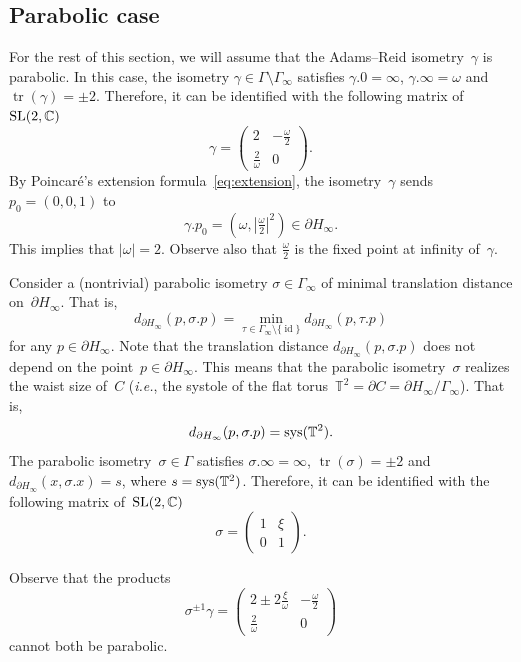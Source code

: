 \documentclass[11pt,reqno]{amsart}
\theoremstyle{definition}
\numberwithin{equation}{section}
\newcommand\T {{\mathbb T}}
\newcommand\C {{\mathbb C}}
\newcommand\ie{{\it i.e.}}
\DeclareMathOperator{\sys}{{\rm sys}}
\DeclareMathOperator{\id}{id}
\DeclareMathOperator{\tr}{tr}
\newcommand{\SL}{{\rm SL}}
\numberwithin{equation}{section}
\begin{document}
\subsection{Parabolic case}


For the rest of this section, we will assume that the Adams--Reid isometry~$\gamma$ is parabolic.
In this case, the isometry $\gamma \in \Gamma \setminus \Gamma_\infty$ satisfies $\gamma.0=\infty$, $\gamma.\infty=\omega$ and~$\tr(\gamma)=\pm 2$.
Therefore, it can be identified with the following matrix of~$\SL(2,\C)$
\[
\gamma = 
\begin{pmatrix}
2 & - \frac{\omega}{2} \\
\frac{2}{\omega} & 0
\end{pmatrix}.
\]
By Poincar\'e's extension formula~\eqref{eq:extension}, the isometry~$\gamma$ sends $p_0=(0,0,1)$ to
\[
\gamma .p_0 = \left( \omega, \left| \tfrac{\omega}{2} \right|^2 \right) \in \partial H_\infty.
\]
This implies that $|\omega| = 2$.
Observe also that $\frac{\omega}{2}$ is the fixed point at infinity of~$\gamma$.

\medskip

Consider a (nontrivial) parabolic isometry $\sigma \in \Gamma_\infty$ of minimal translation distance on~$\partial H_\infty$.
That is,
\[
d_{\partial H_\infty}(p, \sigma .p) = \min_{\tau \in \Gamma_\infty \setminus \{ \id \}} d_{\partial H_\infty}(p, \tau .p)
\]
for any $p \in \partial H_\infty$.
Note that the translation distance $d_{\partial H_\infty}(p, \sigma .p)$ does not depend on the point~$p \in \partial H_\infty$.
This means that the parabolic isometry~$\sigma$ realizes the waist size of~$C$ (\ie, the systole of the flat torus~$\T^2 = \partial C = \partial H_\infty / \Gamma_\infty$).
That is,
\begin{equation} \label{eq:s}
d_{\partial H_\infty}(p, \sigma .p) = \sys(\T^2).
\end{equation}
The parabolic isometry~$\sigma \in \Gamma$ satisfies $\sigma . \infty=\infty$, $\tr(\sigma)=\pm 2$ and $d_{\partial H_\infty}(x,\sigma .x) = s$, where $s=\sys(\T^2)$.
Therefore, it can be identified with the following matrix of~$\SL(2,\C)$
\[
\sigma = 
\begin{pmatrix}
1 & \xi \\
0 & 1
\end{pmatrix}.
\]

Observe that the products
\[
\sigma^{\pm 1} \gamma = 
\begin{pmatrix}
2 \pm 2 \frac{\xi}{\omega} & - \frac{\omega}{2} \\
\frac{2}{\omega} & 0
\end{pmatrix}
\]
cannot both be parabolic.
\end{document}
